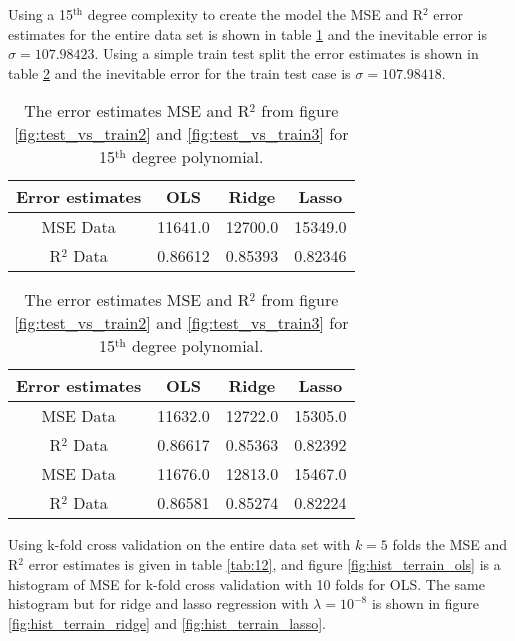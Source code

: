 \documentclass[uio,jmp,amsmath,amssymb,reprint,nofootinbib]{revtex4-1}
\numberwithin{equation}{section}
\begin{document}
Using a 15\(^\text{th}\) degree complexity to create the model the MSE and R\(^2\) error estimates for the entire data set is shown in table \ref{tab:10} and the inevitable error is \(\sigma = 107.98423\). Using a simple train test split the error estimates is shown in table \ref{tab:11} and the inevitable error for the train test case is \(\sigma = 107.98418\).

\begin{table}
\begin{tabular}{|c|c|c|c|}\hline
Error estimates & OLS & Ridge & Lasso\\ \hline
MSE Data & 11641.0 & 12700.0 & 15349.0 \\ \hline
R\(^2\) Data & 0.86612 & 0.85393 & 0.82346 \\ \hline
\end{tabular}
\caption{The error estimates MSE and R\(^2\) from figure \ref{fig:test_vs_train2} and \ref{fig:test_vs_train3} for 15\(^\text{th}\) degree polynomial.}
\label{tab:10}
\end{table}

\begin{table}
\begin{tabular}{|c|c|c|c|}\hline
Error estimates & OLS & Ridge & Lasso\\ \hline
MSE Data & 11632.0 & 12722.0 & 15305.0 \\ \hline
R\(^2\) Data & 0.86617 & 0.85363 & 0.82392 \\ \hline
MSE Data & 11676.0 & 12813.0 & 15467.0 \\ \hline
R\(^2\) Data & 0.86581 & 0.85274 & 0.82224 \\ \hline
\end{tabular}
\caption{The error estimates MSE and R\(^2\) from figure \ref{fig:test_vs_train2} and \ref{fig:test_vs_train3} for 15\(^\text{th}\) degree polynomial.}
\label{tab:11}
\end{table}

Using k-fold cross validation on the entire data set with \(k=5\) folds the MSE and R\(^2\) error estimates is given in table \ref{tab:12}, and figure \ref{fig:hist_terrain_ols} is a histogram of MSE for k-fold cross validation with 10 folds for OLS. The same histogram but for ridge and lasso regression with \(\lambda = 10^{-8}\) is shown in figure \ref{fig:hist_terrain_ridge} and \ref{fig:hist_terrain_lasso}.
\end{document}

